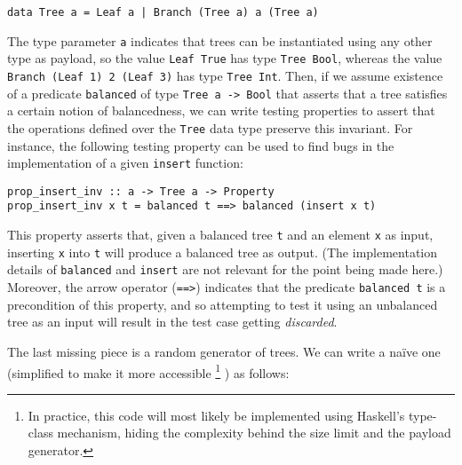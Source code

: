 \documentclass[sigconf, anonymous, review]{acmart}
\newcommand{\quickcheck}{\textit{QuickCheck}\xspace}
\begin{document}
\begin{verbatim}
data Tree a = Leaf a | Branch (Tree a) a (Tree a)
\end{verbatim}

\noindent The type parameter \texttt{a} indicates that trees can be instantiated
using any other type as payload, so the value \texttt{Leaf True} has type
\texttt{Tree Bool}, whereas the value \texttt{Branch (Leaf 1) 2 (Leaf 3)} has
type \texttt{Tree Int}.
%
%
%
%
Then, if we assume existence of a predicate \texttt{balanced} of type
\texttt{Tree a -> Bool} that asserts that a tree satisfies a certain notion of
balancedness, we can write testing properties to assert that the operations
defined over the \texttt{Tree} data type preserve this invariant.
%
For instance, the following testing property can be used to find bugs in the
implementation of a given \texttt{insert} function:

\begin{verbatim}
prop_insert_inv :: a -> Tree a -> Property
prop_insert_inv x t = balanced t ==> balanced (insert x t)
\end{verbatim}


\noindent This property asserts that, given a balanced tree \texttt{t} and an
element \texttt{x} as input, inserting \texttt{x} into \texttt{t} will produce a
balanced tree as output.
%
(The implementation details of \texttt{balanced} and \texttt{insert} are not
relevant for the point being made here.)
%
Moreover, the arrow operator (\texttt{==>}) indicates that the predicate
\texttt{balanced t} is a precondition of this property, and so attempting to
test it using an unbalanced tree as an input will result in the test case
getting \emph{discarded}.


The last missing piece is a random generator of trees.
%
We can write a na\"ive one (simplified to make it more accessible%
\footnote{In practice, this code will most likely be implemented using Haskell's
  type-class mechanism, hiding the complexity behind the size limit and the
  payload generator.}%
) as follows:
\end{document}
